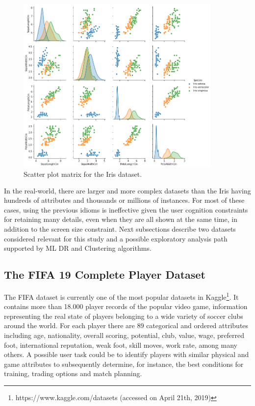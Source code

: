 \begin{figure}[ht]
 \centering
 \includegraphics[width=0.9\textwidth]{iris-scatterplot.png}
 \caption{Scatter plot matrix for the Iris dataset.}
 \label{fig:iris-scatterplot}
\end{figure}

In the real-world, there are larger and more complex datasets than the Iris having hundreds of attributes and thousands or millions of instances. For most of these cases, using the previous idioms is ineffective given the user cognition constraints for retaining many details, even when they are all shown at the same time, in addition to the screen size constraint. Next subsections describe two datasets considered relevant for this study and a possible exploratory analysis path supported by ML DR and Clustering algorithms.

\subsection{The FIFA 19 Complete Player Dataset}
\label{subsection1.1.1}

The FIFA dataset is currently one of the most popular datasets in Kaggle\footnote{https://www.kaggle.com/datasets (accessed on April 21th, 2019)}. It contains more than 18.000 player records of the popular video game, information representing the real state of players belonging to a wide variety of soccer clubs around the world. For each player there are 89 categorical and ordered attributes including age, nationality, overall scoring, potential, club, value, wage, preferred foot, international reputation, weak foot, skill moves, work rate, among many others. A possible user task could be to identify players with similar physical and game attributes to subsequently determine, for instance, the best conditions for training, trading options and match planning.

